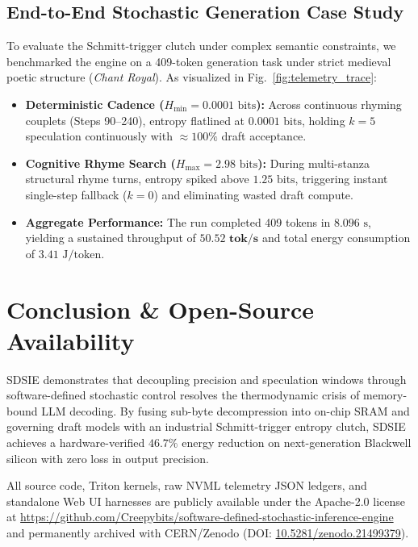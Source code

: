 \documentclass[10pt,journal,compsoc,twocolumn]{IEEEtran}
\begin{document}
\subsection{End-to-End Stochastic Generation Case Study}
To evaluate the Schmitt-trigger clutch under complex semantic constraints, we benchmarked the engine on a 409-token generation task under strict medieval poetic structure (\textit{Chant Royal}). As visualized in Fig.~\ref{fig:telemetry_trace}:
\begin{itemize}
    \item \textbf{Deterministic Cadence ($H_{\text{min}} = 0.0001\text{ bits}$):} Across continuous rhyming couplets (Steps 90--240), entropy flatlined at $0.0001\text{ bits}$, holding $k=5$ speculation continuously with $\approx 100\%$ draft acceptance.
    \item \textbf{Cognitive Rhyme Search ($H_{\text{max}} = 2.98\text{ bits}$):} During multi-stanza structural rhyme turns, entropy spiked above $1.25\text{ bits}$, triggering instant single-step fallback ($k=0$) and eliminating wasted draft compute.
    \item \textbf{Aggregate Performance:} The run completed 409 tokens in $8.096\text{ s}$, yielding a sustained throughput of $\mathbf{50.52\text{ tok/s}}$ and total energy consumption of $3.41\text{ J/token}$.
\end{itemize}

\section{Conclusion \& Open-Source Availability}
SDSIE demonstrates that decoupling precision and speculation windows through software-defined stochastic control resolves the thermodynamic crisis of memory-bound LLM decoding. By fusing sub-byte decompression into on-chip SRAM and governing draft models with an industrial Schmitt-trigger entropy clutch, SDSIE achieves a hardware-verified $46.7\%$ energy reduction on next-generation Blackwell silicon with zero loss in output precision.

All source code, Triton kernels, raw NVML telemetry JSON ledgers, and standalone Web UI harnesses are publicly available under the Apache-2.0 license at \url{https://github.com/Creepybits/software-defined-stochastic-inference-engine} and permanently archived with CERN/Zenodo (DOI: \href{https://doi.org/10.5281/zenodo.21499379}{10.5281/zenodo.21499379}).
\end{document}

